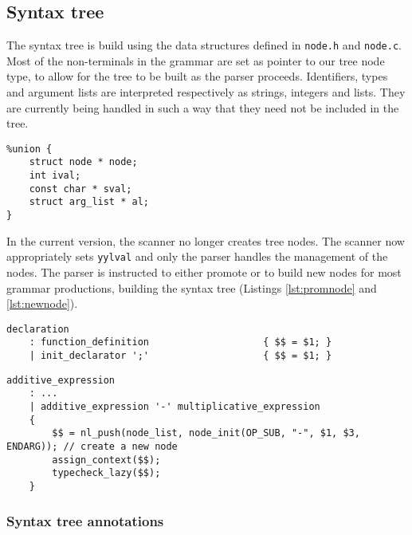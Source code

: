 
\subsection{Syntax tree}
The syntax tree is build using the data structures defined in \texttt{node.h} and \texttt{node.c}.
Most of the non-terminals in the grammar are set as pointer to our tree node type, to allow for the
tree to be built as the parser proceeds. Identifiers, types and argument lists are interpreted
respectively as strings, integers and lists. They are currently being handled in such a way
that they need not be included in the tree.

\begin{lstlisting}
%union {
	struct node * node;
	int ival;
	const char * sval;
	struct arg_list * al;
}
\end{lstlisting}

In the current version, the scanner no longer creates tree nodes. The scanner now
appropriately sets \texttt{yylval} and only the parser handles the management of
the nodes. The parser is instructed to either promote or to build new nodes for
most grammar productions, building the syntax tree (Listings \ref{lst:promnode} and \ref{lst:newnode}).

\begin{lstlisting}[caption={Example of parser rules where nodes are promoted.
This procedure is preformed for productions in which there is no need to create a
new node, since no new information would be gained indoing so.},label={lst:promnode},captionpos=b]
declaration
	: function_definition                    { $$ = $1; }
	| init_declarator ';'                    { $$ = $1; }
\end{lstlisting}

\begin{lstlisting}[caption={Example of a parser rule where a new nodes is
created. Here, we will need to type check and evaluate both operands of
the expression, before we know what attributes will be assigned to the head
of the rule.},label={lst:newnode},captionpos=b]
additive_expression
	: ...
	| additive_expression '-' multiplicative_expression
	{
		$$ = nl_push(node_list, node_init(OP_SUB, "-", $1, $3, ENDARG)); // create a new node
		assign_context($$);
		typecheck_lazy($$);
	}
\end{lstlisting}


\subsubsection{Syntax tree annotations}

